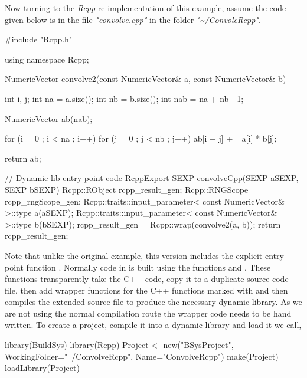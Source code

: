 Now turning to the \emph{Rcpp} re-implementation of this example, assume the code given below is in the file \emph{"convolve.cpp"} in the folder \emph{"\textasciitilde/ConvoleRcpp"}.

\begin{Schunk}
  \begin{Sinput}
  #include "Rcpp.h"

  using namespace Rcpp;
  
  NumericVector convolve2(const NumericVector& a, 
                          const NumericVector& b)
  {
      int i, j;
      int na = a.size();
      int nb = b.size();
      int nab = na + nb - 1;
  
      NumericVector ab(nab);
  
      for (i = 0 ; i < na ; i++)
      {
          for (j = 0 ; j < nb ; j++)
          {
              ab[i + j] += a[i] * b[j];
          }
      }
  
      return ab;
  }
  
  // Dynamic lib entry point code
  RcppExport SEXP convolveCpp(SEXP aSEXP, SEXP bSEXP)
  {
      Rcpp::RObject rcpp_result_gen;
      Rcpp::RNGScope rcpp_rngScope_gen;
      Rcpp::traits::input_parameter< const NumericVector& >::type a(aSEXP);
      Rcpp::traits::input_parameter< const NumericVector& >::type b(bSEXP);
      rcpp_result_gen = Rcpp::wrap(convolve2(a, b));
      return rcpp_result_gen;
  }
  \end{Sinput}
\end{Schunk}

Note that unlike the original example, this version includes the explicit entry point function . 
Normally code in  is built using the  functions  and . These functions 
transparently take the C++ code, copy it to a duplicate source code file, then add wrapper functions for the C++ functions 
marked with  and then compiles the extended source file to produce the necessary dynamic library. As we are 
not using the normal  compilation route the wrapper code needs to be hand written. 
To create a  project, compile it into a dynamic library and load it we call,

\begin{Schunk}
  \begin{Sinput}
  library(BuildSys)
  library(Rcpp)
  Project <- new("BSysProject", WorkingFolder="~/ConvolveRcpp", Name="ConvolveRcpp")
  make(Project)
  loadLibrary(Project)
  \end{Sinput}
\end{Schunk}

